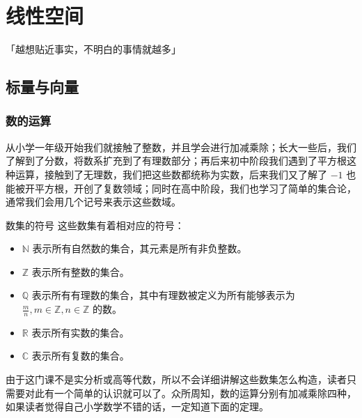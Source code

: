 \chapter{线性空间}
\begin{center}
	「越想贴近事实，不明白的事情就越多」
\end{center}
\vspace{-5pt}
\begin{center}
\end{center}

\section{标量与向量}

\subsection{数的运算}

从小学一年级开始我们就接触了整数，并且学会进行加减乘除；长大一些后，我们了解到了分数，将数系扩充到了有理数部分；再后来初中阶段我们遇到了平方根这种运算，接触到了无理数，我们把这些数都统称为实数，后来我们又了解了 $-1$ 也能被开平方根，开创了复数领域；同时在高中阶段，我们也学习了简单的集合论，通常我们会用几个记号来表示这些数域。

\begin{definition}{数集的符号}
	这些数集有着相对应的符号：
	\begin{itemize}
		\item $\mathbb{N}$ 表示所有自然数的集合，其元素是所有非负整数。
		\item $\mathbb{Z}$ 表示所有整数的集合。
		\item $\mathbb{Q}$ 表示所有有理数的集合，其中有理数被定义为所有能够表示为 $\frac{m}{n},m\in \mathbb{Z},n\in \mathbb{Z}$ 的数。
		\item $\mathbb{R}$ 表示所有实数的集合。
		\item $\mathbb{C}$ 表示所有复数的集合。
	\end{itemize}
\end{definition}

由于这门课不是实分析或高等代数，所以不会详细讲解这些数集怎么构造，读者只需要对此有一个简单的认识就可以了。众所周知，数的运算分别有加减乘除四种，如果读者觉得自己小学数学不错的话，一定知道下面的定理。


